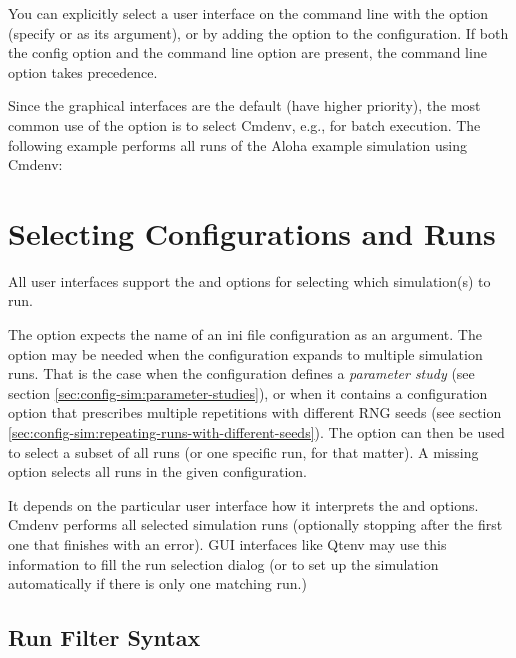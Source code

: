 You can explicitly select a user interface on the command line with the 
option (specify  or  as its argument), or by
adding the  option to the configuration. If both
the config option and the command line option are present, the command line option
takes precedence.

Since the graphical interfaces are the default (have higher priority), the most
common use of the  option is to select Cmdenv, e.g., for batch execution.
The following example performs all runs of the Aloha example simulation using
Cmdenv:



\section{Selecting Configurations and Runs}
\label{sec:run-sim:selecting-configuration-and-runs}

All user interfaces support the  and 
options for selecting which simulation(s) to run.

The  option expects the name of an ini file configuration
as an argument. The  option may be needed when the configuration
expands to multiple simulation runs. That is the case when the
configuration defines a \textit{parameter study} (see section
\ref{sec:config-sim:parameter-studies}), or when it contains
a  configuration option that prescribes
multiple repetitions with different RNG seeds (see section
\ref{sec:config-sim:repeating-runs-with-different-seeds}).
The  option can then be used to select a subset of all runs (or one
specific run, for that matter). A missing  option selects all runs in
the given configuration.

It depends on the particular user interface how it interprets the
 and  options. Cmdenv performs all selected simulation runs
(optionally stopping after the first one that finishes with an error).
GUI interfaces like Qtenv may use this information to fill the
run selection dialog (or to set up the simulation automatically if there is
only one matching run.)


\subsection{Run Filter Syntax}
\label{sec:run-sim:selecting-configuration-and-runs:syntax}

